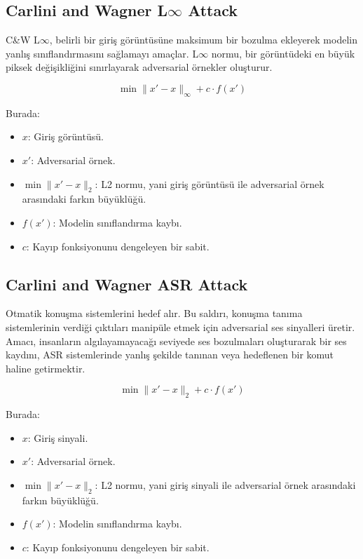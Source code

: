 \newpage

\subsection{Carlini and Wagner L$\infty$ Attack}

C\&W L$\infty$, belirli bir giriş görüntüsüne maksimum bir bozulma ekleyerek modelin yanlış sınıflandırmasını sağlamayı amaçlar. L$\infty$ normu, bir görüntüdeki en büyük piksek değişikliğini sınırlayarak adversarial örnekler oluşturur. 

\[ \min \|x' - x\|_\infty + c \cdot f(x') \]

Burada:

\begin{itemize}
    \item $x$: Giriş görüntüsü.
    \item $x'$: Adversarial örnek.
    \item $\min \|x' - x\|_2$: L2 normu, yani giriş görüntüsü ile adversarial örnek arasındaki farkın büyüklüğü.
    \item $f(x')$: Modelin sınıflandırma kaybı.
    \item $c$: Kayıp fonksiyonunu dengeleyen bir sabit.
\end{itemize}

\newpage

\subsection{Carlini and Wagner ASR Attack}

Otmatik konuşma sistemlerini hedef alır. Bu saldırı, konuşma tanıma sistemlerinin verdiği çıktıları manipüle etmek için adversarial ses sinyalleri üretir. Amacı, insanların algılayamayacağı seviyede ses bozulmaları oluşturarak bir ses kaydını, ASR sistemlerinde yanlış şekilde tanınan veya hedeflenen bir komut haline getirmektir.

\[ \min \|x' - x\|_2 + c \cdot f(x') \]

Burada:

\begin{itemize}
    \item $x$: Giriş sinyali.
    \item $x'$: Adversarial örnek.
    \item $\min \|x' - x\|_2$: L2 normu, yani giriş sinyali ile adversarial örnek arasındaki farkın büyüklüğü.
    \item $f(x')$: Modelin sınıflandırma kaybı.
    \item $c$: Kayıp fonksiyonunu dengeleyen bir sabit.
\end{itemize}

